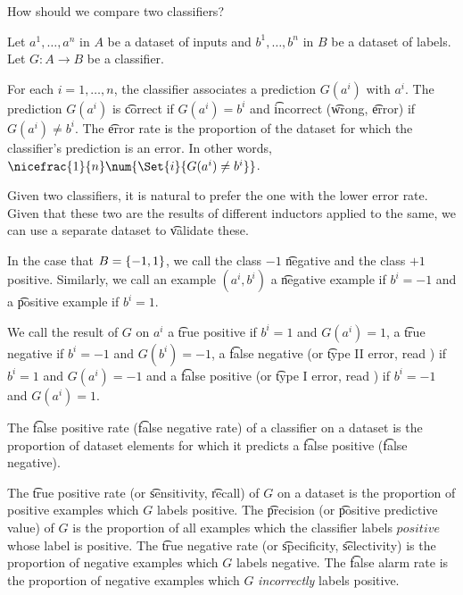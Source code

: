 
How should we compare two classifiers?

Let $a^1, \dots , a^n$ in $A$ be a dataset of inputs and $b^1, \dots , b^n$ in $B$ be a dataset of labels.
Let $G: A \to B$ be a classifier.

For each $i = 1, \dots , n$, the classifier associates a prediction $G(a^i)$ with $a^i$.
The prediction $G(a^i)$ is \t{correct} if $G(a^i) = b^i$ and \t{incorrect} (\t{wrong}, \t{error}) if $G(a^i) \neq b^i$.
The \t{error rate} is the proportion of the dataset for which the classifier's prediction is an error.
In other words, $\nicefrac{1}{n}\num{\Set{i}{G(a^i) \neq b^i}}$.

Given two classifiers, it is natural to prefer the one with the lower error rate.
Given that these two are the results of different inductors applied to the same, we can use a separate dataset to \t{validate} these.


In the case that $B = \{-1, 1\}$, we call the class $-1$ \t{negative} and the class $+1$ positive.
Similarly, we call an example $(a^i, b^i)$ a \t{negative example} if $b^i = -1$ and a \t{positive example} if $b^i = 1$.

We call the result of $G$ on $a^i$ a \t{true positive} if $b^i = 1$ and $G(a^i) = 1$, a \t{true negative} if $b^i = -1$ and $G(b^i) = -1$, a \t{false negative} (or \t{type II error}, read ) if $b^i = 1$ and $G(a^i) = -1$ and a \t{false positive} (or \t{type I error}, read ) if $b^i = -1$ and $G(a^i) = 1$.

The \t{false positive rate} (\t{false negative rate}) of a classifier on a dataset is the proportion of dataset elements for which it predicts a \t{false positive} (\t{false negative}).

The \t{true positive rate} (or \t{sensitivity}, \t{recall}) of $G$ on a dataset is the proportion of positive examples which $G$ labels positive.
The \t{precision} (or \t{positive predictive value}) of $G$ is the proportion of all examples which the classifier labels $positive$ whose label is positive.
The \t{true negative rate} (or \t{specificity}, \t{selectivity}) is the proportion of negative examples which $G$ labels negative.
The \t{false alarm rate} is the proportion of negative examples which $G$ \textit{incorrectly} labels positive.

\blankpage
